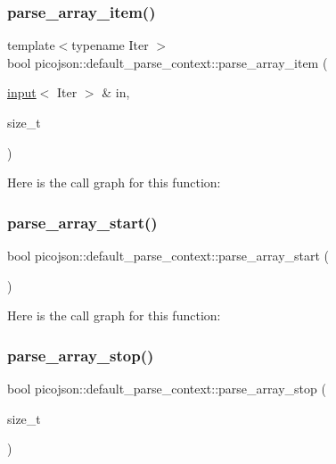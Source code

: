 \subsubsection{\texorpdfstring{parse\+\_\+array\+\_\+item()}{parse\_array\_item()}}
{\footnotesize\ttfamily template$<$typename Iter $>$ \\
bool picojson\+::default\+\_\+parse\+\_\+context\+::parse\+\_\+array\+\_\+item (\begin{DoxyParamCaption}\item[{\hyperlink{classpicojson_1_1input}{input}$<$ Iter $>$ \&}]{in,  }\item[{size\+\_\+t}]{ }\end{DoxyParamCaption})\hspace{0.3cm}{\ttfamily [inline]}}

Here is the call graph for this function\+:
\hypertarget{classpicojson_1_1default__parse__context_a5c355f843ceacde134997f5bbbda1d23}{}\label{classpicojson_1_1default__parse__context_a5c355f843ceacde134997f5bbbda1d23} 
\subsubsection{\texorpdfstring{parse\+\_\+array\+\_\+start()}{parse\_array\_start()}}
{\footnotesize\ttfamily bool picojson\+::default\+\_\+parse\+\_\+context\+::parse\+\_\+array\+\_\+start (\begin{DoxyParamCaption}{ }\end{DoxyParamCaption})\hspace{0.3cm}{\ttfamily [inline]}}

Here is the call graph for this function\+:
\hypertarget{classpicojson_1_1default__parse__context_aa6ac46d87d620377429438675ba9fab2}{}\label{classpicojson_1_1default__parse__context_aa6ac46d87d620377429438675ba9fab2} 
\subsubsection{\texorpdfstring{parse\+\_\+array\+\_\+stop()}{parse\_array\_stop()}}
{\footnotesize\ttfamily bool picojson\+::default\+\_\+parse\+\_\+context\+::parse\+\_\+array\+\_\+stop (\begin{DoxyParamCaption}\item[{size\+\_\+t}]{ }\end{DoxyParamCaption})\hspace{0.3cm}{\ttfamily [inline]}}

